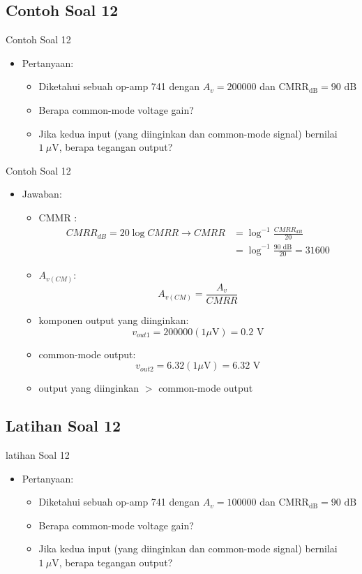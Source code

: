 \documentclass[aspectratio=169]{beamer}
\begin{document}
\subsection{Contoh Soal 12}
\begin{frame}{Contoh Soal 12}
	\begin{itemize}
		\item Pertanyaan:
		\begin{itemize}
			\item Diketahui sebuah op-amp 741 dengan $ A_v = 200000 $ dan $ \text{CMRR}_\text{dB} = 90 \text{ dB}$
			\item Berapa common-mode voltage gain?
			\item Jika kedua input (yang diinginkan dan common-mode signal) bernilai $ 1~\mu\text{V} $, berapa tegangan output?
		\end{itemize}
	\end{itemize}
\end{frame}

\begin{frame}{Contoh Soal 12}
	\begin{itemize}
		\item Jawaban:
		\begin{itemize}
			\item CMMR :
			\begin{align*}
				CMRR_{dB} = 20 \log CMRR \rightarrow CMRR &= \log^{-1}\frac{ CMRR_{dB} }{20} \\
				&= \log^{-1} \frac{ 90 \text{ dB} }{20} = 31600
			\end{align*}
			\item $ A_{v(CM)} $:
			\[ A_{v(CM)} =  \frac{A_v}{CMRR} \]
			\item komponen output yang diinginkan:
			\[ v_{out1} = 200000(1 \mu\text{V}) = 0.2 \text{ V} \]
			\item common-mode output:
			\[ v_{out2} = 6.32(1 \mu\text{V}) = 6.32 \text{ V} \]
			\item output yang diinginkan $ > $ common-mode output
		\end{itemize}
	\end{itemize}
\end{frame}

\subsection{Latihan Soal 12}
\begin{frame}{latihan Soal 12}
	\begin{itemize}
		\item Pertanyaan:
		\begin{itemize}
			\item Diketahui sebuah op-amp 741 dengan $ A_v = 100000 $ dan $ \text{CMRR}_\text{dB} = 90 \text{ dB}$
			\item Berapa common-mode voltage gain?
			\item Jika kedua input (yang diinginkan dan common-mode signal) bernilai $ 1~\mu\text{V} $, berapa tegangan output?
		\end{itemize}
	\end{itemize}
\end{frame}
\end{document}
